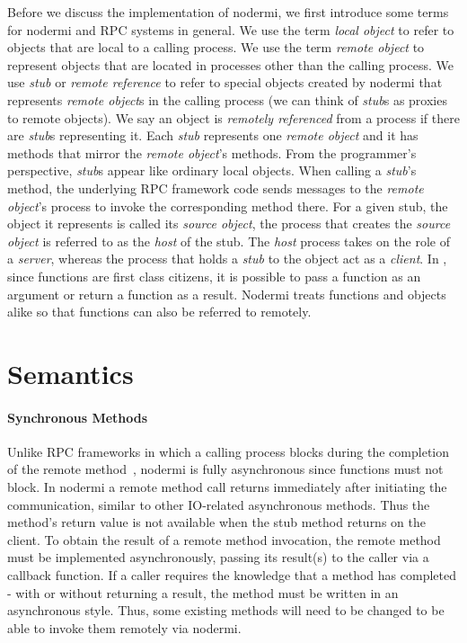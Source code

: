 Before we discuss the implementation of nodermi,
we first introduce some terms for nodermi and
RPC systems in general.
We use the term \emph{local object}
to refer to objects that are local to a calling process.
We use the term \emph{remote object} to represent objects that are
located in processes other than the calling process.
We use \emph{stub} or \emph{remote reference} to refer to special objects created
by nodermi that represents \emph{remote object}s in the calling process
(we can think of \emph{stub}s as proxies to remote objects).
We say an object is \emph{remotely referenced} from a process
if there are \emph{stub}s representing it.
Each \emph{stub} represents one \emph{remote object} and
it has methods that mirror the \emph{remote object}'s methods.
From the programmer's perspective,
\emph{stub}s appear like ordinary local objects.
When calling a \emph{stub}'s method, the underlying
RPC framework code sends messages to the \emph{remote object}'s process
to invoke the corresponding method there.
For a given stub,
the object it represents is called its \emph{source object},
the process that creates the \emph{source object}
is referred to as the \emph{host} of the stub. 
The \emph{host} process takes on the role of a \emph{server}, 
whereas the process that holds a \emph{stub} to the object act as a \emph{client}.
In \js{}, since functions are first class citizens, it is possible
to pass a function as an argument or return a function as a result.
Nodermi treats functions and objects alike so that functions can also be
referred to remotely.

\section{Semantics}
\label{sec:semantics}

\nodermiexamplefig{}

\paragraph{Synchronous Methods}
Unlike RPC frameworks in which a calling process blocks during the
completion of the remote method~\cite{birrell1984implementing},
nodermi is fully asynchronous since \js{} functions must not block.
In nodermi a remote method call returns immediately after initiating the communication,
similar to other IO-related asynchronous methods.
Thus the method's return value is not available when the stub method returns on the client.
To obtain the result of a remote method invocation,
the remote method must be implemented asynchronously,
passing its result(s) to the caller via a callback function.
If a caller requires the knowledge that a method has completed - with or without
returning a result, the method must be written in an asynchronous style.
Thus, some existing methods will need to be changed to be able to invoke them 
remotely via nodermi.


